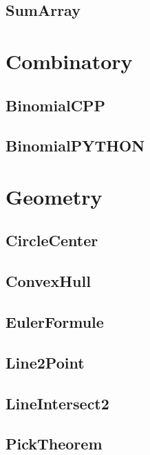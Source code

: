 \subsection{ SumArray}
\raggedbottom
\hrulefill

\section{Combinatory}
\subsection{ BinomialCPP}
\raggedbottom
\hrulefill
\subsection{ BinomialPYTHON}
\raggedbottom
\hrulefill

\section{Geometry}
\subsection{ CircleCenter}
\raggedbottom
\hrulefill
\subsection{ ConvexHull}
\raggedbottom
\hrulefill
\subsection{ EulerFormule}
\raggedbottom
\hrulefill
\subsection{ Line2Point}
\raggedbottom
\hrulefill
\subsection{ LineIntersect2}
\raggedbottom
\hrulefill
\subsection{ PickTheorem}
\raggedbottom
\hrulefill
